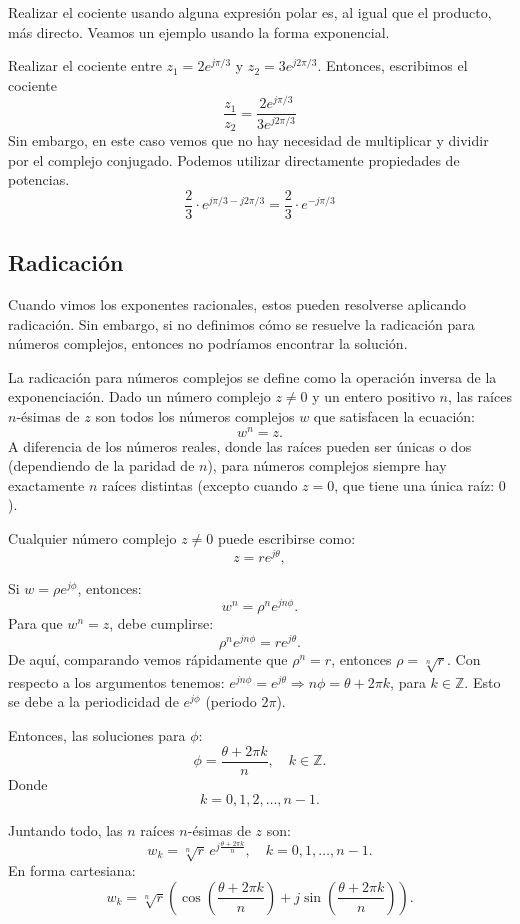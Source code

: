Realizar el cociente usando alguna expresión polar es, al igual que el producto, más directo. Veamos un ejemplo usando la forma exponencial.
\begin{example}
  Realizar el cociente entre $z_1=2e^{j\pi/3}$ y $z_2=3e^{j2\pi/3}$. Entonces, escribimos el cociente
  $$
  \frac{z_1}{z_2}=\frac{2e^{j\pi/3}}{3e^{j2\pi/3}}
  $$
  Sin embargo, en este caso vemos que no hay necesidad de multiplicar y dividir por el complejo conjugado. Podemos utilizar directamente propiedades de potencias.
  $$
  \frac{2}{3}\cdot e^{j\pi/3 - j2\pi/3} = \frac{2}{3}\cdot e^{-j\pi/3}
  $$
\end{example}

\subsection{Radicación}

Cuando vimos los exponentes racionales, estos pueden resolverse aplicando radicación. Sin embargo, si no definimos cómo se resuelve la radicación para números complejos, entonces no podríamos encontrar la solución.

La radicación para números complejos se define como la operación inversa de la exponenciación. Dado un número complejo \( z \neq 0 \) y un entero positivo \( n \), las raíces \( n \)-ésimas de \( z \) son todos los números complejos \( w \) que satisfacen la ecuación:
\[
w^n = z.
\]
A diferencia de los números reales, donde las raíces pueden ser únicas o dos (dependiendo de la paridad de \( n \)), para números complejos siempre hay exactamente \( n \) raíces distintas (excepto cuando \( z = 0 \), que tiene una única raíz: \( 0 \)).

Cualquier número complejo \( z \neq 0 \) puede escribirse como:
\[
 z = r e^{j\theta},
\]

Si \( w = \rho e^{j\phi} \), entonces:
\[
 w^n = \rho^n e^{j n \phi}.
\]
Para que \( w^n = z \), debe cumplirse:
\[
 \rho^n e^{j n \phi} = r e^{j\theta}.
\]
De aquí, comparando vemos rápidamente que $\rho^n=r$, entonces $\rho=\sqrt[n]{r}$. Con respecto a los argumentos tenemos: \( e^{j n \phi} = e^{j\theta} \Rightarrow n\phi = \theta + 2\pi k \), para \( k \in \mathbb{Z} \). Esto se debe a la periodicidad de \( e^{j\phi} \) (periodo \( 2\pi \)).

Entonces, las soluciones para \( \phi \):
\[
\phi = \frac{\theta + 2\pi k}{n}, \quad k \in \mathbb{Z}.
\]
Donde 
\[
k = 0, 1, 2, \dots, n-1.
\]

Juntando todo, las \( n \) raíces \( n \)-ésimas de \( z \) son:
\[
w_k = \sqrt[n]{r} \, e^{j \frac{\theta + 2\pi k}{n}}, \quad k = 0, 1, \dots, n-1.
\]
En forma cartesiana:
\[
w_k = \sqrt[n]{r} \left( \cos\left( \frac{\theta + 2\pi k}{n} \right) + j \sin\left( \frac{\theta + 2\pi k}{n} \right) \right).
\]

